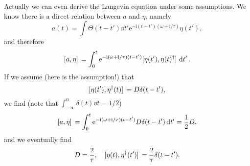 \documentclass[hyperref, a4paper]{article}
\newcommand*{\ii}{\mathrm{i}}
\newcommand*{\ee}{\mathrm{e}}
\begin{document}
Actually we can even derive the Langevin equation under some assumptions.
We know there is a direct relation between $a$ and $\eta$, namely 
\begin{equation}
    a(t) = \int \Theta(t - t') \dd{t'} \ee^{- \ii (t - t') (\omega + \ii / \tau)} \eta(t'),
\end{equation}
and therefore 
\begin{equation}
    \comm*{a}{\eta} = \int_{0}^{t} \ee^{- \ii (\omega + \ii / \tau) (t - t')} \comm*{\eta(t')}{\eta(t)^\dag} \dd{t'}.
\end{equation}
If we assume (here is the assumption!) that 
\begin{equation}
    \comm*{\eta(t')}{\eta^\dag(t)} = D \delta(t - t'),
\end{equation}
we find (note that $\int_{-\infty}^{0} \delta(t) \dd{t} = 1/2$)
\[
    \comm*{a}{\eta} = \int_{0}^{t} \ee^{- \ii (\omega + \ii / \tau) (t - t')} D \delta(t - t') \dd{t'}
    = \frac{1}{2} D,
\]
and we eventually find 
\begin{equation}
    D = \frac{2}{\tau}, \quad 
    \comm*{\eta(t)}{\eta^\dag(t')} = \frac{2}{\tau} \delta(t - t').
\end{equation}
\end{document}

